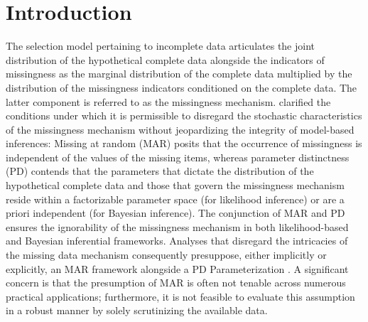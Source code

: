 \documentclass[twoside]{article}
\begin{document}
\section{Introduction}
The selection model pertaining to incomplete data articulates the joint distribution of the hypothetical complete data alongside the indicators of missingness as the marginal distribution of the complete data multiplied by the distribution of the missingness indicators conditioned on the complete data. The latter component is referred to as the missingness mechanism. \cite{Rubin:1976} clarified the conditions under which it is permissible to disregard the stochastic characteristics of the missingness mechanism without jeopardizing the integrity of model-based inferences: Missing at random (MAR) posits that the occurrence of missingness is independent of the values of the missing items, whereas parameter distinctness (PD) contends that the parameters that dictate the distribution of the hypothetical complete data and those that govern the missingness mechanism reside within a factorizable parameter space (for likelihood inference) or are a priori independent (for Bayesian inference). The conjunction of MAR and PD ensures the ignorability of the missingness mechanism in both likelihood-based and Bayesian inferential frameworks.
Analyses that disregard the intricacies of the missing data mechanism consequently presuppose, either implicitly or explicitly, an MAR  framework alongside a PD Parameterization   \citep{Little:1992, Little:Rubin:2002,Paik:Sacco:2000,Satten:Carroll:2000}. A significant concern is that the presumption of MAR is often not tenable across numerous practical applications; furthermore, it is not feasible to evaluate this assumption in a robust manner by solely scrutinizing the available data.
\end{document}
